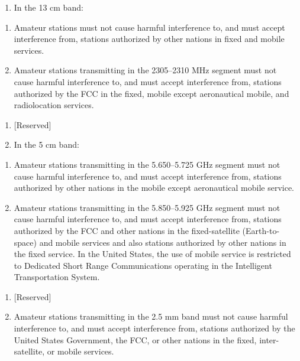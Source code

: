 \documentclass[
  letterpaper,
  DIV=11,
  numbers=noendperiod]{scrreport}
\providecommand{\tightlist}{%
  \setlength{\itemsep}{0pt}\setlength{\parskip}{0pt}}\usepackage{longtable,booktabs,array}
\begin{document}
\begin{enumerate}
\def\labelenumi{(\alph{enumi})}
\setcounter{enumi}{15}
\tightlist
\item
  In the 13 cm band:
\end{enumerate}

\begin{enumerate}
\def\labelenumi{(\arabic{enumi})}
\item
  Amateur stations must not cause harmful interference to, and must
  accept interference from, stations authorized by other nations in
  fixed and mobile services.
\item
  Amateur stations transmitting in the 2305--2310 MHz segment must not
  cause harmful interference to, and must accept interference from,
  stations authorized by the FCC in the fixed, mobile except
  aeronautical mobile, and radiolocation services.
\end{enumerate}

\begin{enumerate}
\def\labelenumi{(\alph{enumi})}
\setcounter{enumi}{16}
\item
  {[}Reserved{]}
\item
  In the 5 cm band:
\end{enumerate}

\begin{enumerate}
\def\labelenumi{(\arabic{enumi})}
\item
  Amateur stations transmitting in the 5.650--5.725 GHz segment must not
  cause harmful interference to, and must accept interference from,
  stations authorized by other nations in the mobile except aeronautical
  mobile service.
\item
  Amateur stations transmitting in the 5.850--5.925 GHz segment must not
  cause harmful interference to, and must accept interference from,
  stations authorized by the FCC and other nations in the
  fixed-satellite (Earth-to-space) and mobile services and also stations
  authorized by other nations in the fixed service. In the United
  States, the use of mobile service is restricted to Dedicated Short
  Range Communications operating in the Intelligent Transportation
  System.
\end{enumerate}

\begin{enumerate}
\def\labelenumi{(\alph{enumi})}
\setcounter{enumi}{18}
\item
  {[}Reserved{]}
\item
  Amateur stations transmitting in the 2.5 mm band must not cause
  harmful interference to, and must accept interference from, stations
  authorized by the United States Government, the FCC, or other nations
  in the fixed, inter-satellite, or mobile services.
\end{enumerate}
\end{document}
